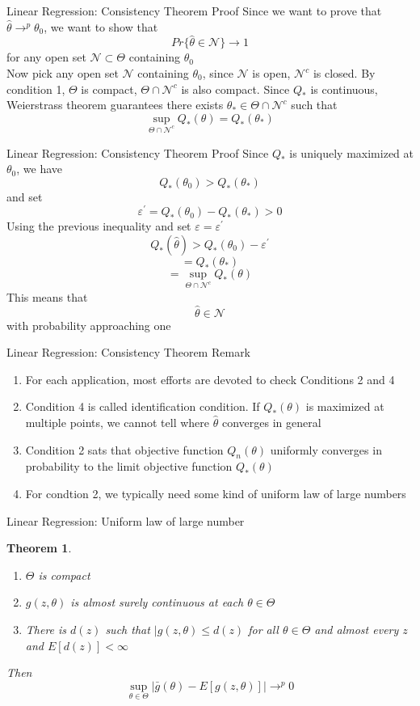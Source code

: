 \documentclass{beamer}
\newtheorem{thm}{Theorem}[subsection]
\begin{document}
\begin{frame}{Linear Regression: Consistency Theorem Proof}
	Since we want to prove that $\hat{\theta} \rightarrow^p \theta_0$, we want to show that 
	\[Pr\{\hat{\theta} \in \mathcal{N}\} \rightarrow 1\]
	for any open set $\mathcal{N} \subset \Theta$ containing $\theta_0$ \\
	Now pick any open set $\mathcal{N}$ containing $\theta_0$, since $\mathcal{N}$ is open, $\mathcal{N}^c$ is closed. By condition 1, $\Theta$ is compact, $\Theta \cap \mathcal{N}^c$ is also compact. Since $Q_*$ is continuous, Weierstrass theorem guarantees there exists $\theta_* \in \Theta \cap \mathcal{N}^c$ such that 
	\[\sup_{\Theta \cap \mathcal{N}^c} Q_*(\theta) = Q_*(\theta_*)\]
\end{frame}
\begin{frame}{Linear Regression: Consistency Theorem Proof}
	Since $Q_*$ is uniquely maximized at $\theta_0$, we have 
	\[Q_*(\theta_0) > Q_*(\theta_*)\]
	and set
	\[\varepsilon^{'} = Q_*(\theta_0) - Q_*(\theta_*) > 0\]
	Using the previous inequality and set $\varepsilon = \varepsilon^{'}$
	\[Q_*(\hat{\theta}) > Q_*(\theta_0) - \varepsilon^{'}\]
	\[ =  Q_*(\theta_*)\]
	\[= \sup_{\Theta \cap \mathcal{N}^c} Q_*(\theta)\]
	This means that 
	\[\hat{\theta} \in \mathcal{N}\]
	with probability approaching one
\end{frame}

\begin{frame}{Linear Regression: Consistency Theorem Remark}
	\begin{enumerate}
		\item For each application, most efforts are devoted to check Conditions 2 and 4
		\item Condition 4 is called identification condition. If $Q_*(\theta)$ is maximized at multiple points, we cannot tell where $\hat{\theta}$ converges in general
		\item Condition 2 sats that objective function $Q_n(\theta)$ uniformly converges in probability to the limit objective function $Q_*(\theta)$
		\item For condtion 2, we typically need some kind of uniform law of large numbers
	\end{enumerate}
\end{frame}

\begin{frame}{Linear Regression: Uniform law of large number}
	\begin{thm}
		\begin{enumerate}
				\item $\Theta$ is compact
				\item $g(z,\theta)$ is almost surely continuous at each $\theta \in \Theta$
				\item There is $d(z)$ such that $|g(z,\theta) \leq d(z)$ for all $\theta \in \Theta$ and almost every $z$ and $E[d(z)] < \infty$
		\end{enumerate}
		Then 
		\[\sup_{\theta \in \Theta} |\bar{g}(\theta) - E[g(z,\theta)]| \rightarrow^p 0\]
	\end{thm}
\end{frame}
\end{document}
